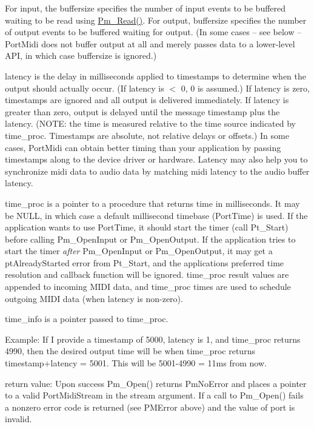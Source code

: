 For input, the buffersize specifies the number of input events to be buffered waiting to be read using \hyperlink{group__grp__io_ga3d59225bc890ede974f245ada3de6456}{Pm\+\_\+\+Read()}. For output, buffersize specifies the number of output events to be buffered waiting for output. (In some cases -- see below -- Port\+Midi does not buffer output at all and merely passes data to a lower-\/level A\+PI, in which case buffersize is ignored.)

latency is the delay in milliseconds applied to timestamps to determine when the output should actually occur. (If latency is $<$ 0, 0 is assumed.) If latency is zero, timestamps are ignored and all output is delivered immediately. If latency is greater than zero, output is delayed until the message timestamp plus the latency. (N\+O\+TE\+: the time is measured relative to the time source indicated by time\+\_\+proc. Timestamps are absolute, not relative delays or offsets.) In some cases, Port\+Midi can obtain better timing than your application by passing timestamps along to the device driver or hardware. Latency may also help you to synchronize midi data to audio data by matching midi latency to the audio buffer latency.

time\+\_\+proc is a pointer to a procedure that returns time in milliseconds. It may be N\+U\+LL, in which case a default millisecond timebase (Port\+Time) is used. If the application wants to use Port\+Time, it should start the timer (call Pt\+\_\+\+Start) before calling Pm\+\_\+\+Open\+Input or Pm\+\_\+\+Open\+Output. If the application tries to start the timer {\itshape after} Pm\+\_\+\+Open\+Input or Pm\+\_\+\+Open\+Output, it may get a pt\+Already\+Started error from Pt\+\_\+\+Start, and the application\textquotesingle{}s preferred time resolution and callback function will be ignored. time\+\_\+proc result values are appended to incoming M\+I\+DI data, and time\+\_\+proc times are used to schedule outgoing M\+I\+DI data (when latency is non-\/zero).

time\+\_\+info is a pointer passed to time\+\_\+proc.

Example\+: If I provide a timestamp of 5000, latency is 1, and time\+\_\+proc returns 4990, then the desired output time will be when time\+\_\+proc returns timestamp+latency = 5001. This will be 5001-\/4990 = 11ms from now.

return value\+: Upon success Pm\+\_\+\+Open() returns Pm\+No\+Error and places a pointer to a valid Port\+Midi\+Stream in the stream argument. If a call to Pm\+\_\+\+Open() fails a nonzero error code is returned (see P\+M\+Error above) and the value of port is invalid.

